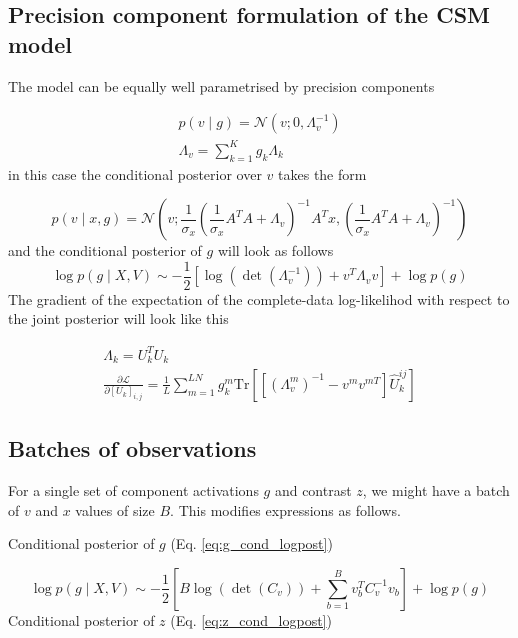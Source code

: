\documentclass{paper}
\begin{document}
\subsection{Precision component formulation of the CSM model}

The model can be equally well parametrised by precision components

\begin{eqnarray}
p(v \mid g) = \mathcal{N}(v; 0,\Lambda_v^{-1}) \\
\Lambda_v = \sum_{k=1}^K g_k \Lambda_k \label{eq:cv}
\end{eqnarray}
%
in this case the conditional posterior over $v$ takes the form

\begin{equation}
p(v \mid x,g) = \mathcal{N}\left(v; \frac{1}{\sigma_x} \left(\frac{1}{\sigma_x} A^T A + \Lambda_v \right)^{-1} A^T x, \left(\frac{1}{\sigma_x} A^T A + \Lambda_v\right)^{-1}\right)
\end{equation}
%
and the conditional posterior of $g$ will look as follows
\begin{equation} 
\log p(g \mid X,V) \sim -\frac{1}{2} \left[ \log(\det(\Lambda_v^{-1})) + v^T \Lambda_v v\right] + \log p(g)
\end{equation}
%
The gradient of the expectation of the complete-data log-likelihod with respect to the joint posterior will look like this

\begin{eqnarray}
\Lambda_k = U_k^T U_k \\
\frac{\partial \mathcal{L}}{\partial \left[ U_k \right]_{i,j}} = \frac{1}{L} \sum_{m=1}^{LN} g_k^{m} \textrm{Tr} \left[ \left[ \left( \Lambda_v^m \right)^{-1} - v^m v^{mT} \right] \hat U_k^{ij} \right]
\end{eqnarray}

\subsection{Batches of observations}

For a single set of component activations $g$ and contrast $z$, we might have a batch of $v$ and $x$ values of size $B$. This modifies expressions as follows.

Conditional posterior of $g$ (Eq. \ref{eq:g_cond_logpost})

\begin{equation} 
\log p(g \mid X,V) \sim -\frac{1}{2} \left[B\log(\det(C_v)) + \sum_{b=1}^B v_b^T C_v^{-1} v_b\right] + \log p(g)
\end{equation}
%
Conditional posterior of $z$ (Eq. \ref{eq:z_cond_logpost})
\end{document}
